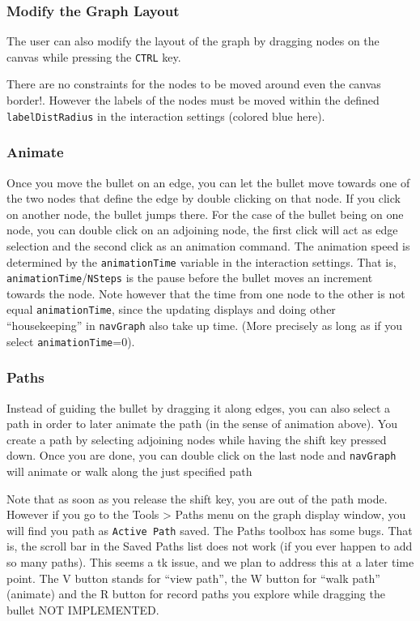 \documentclass[12pt,oneside,titlepage,letter]{article}
\newcommand{\modify}[1]{{\color{blue}#1}}
\begin{document}
\subsubsection{Modify the Graph Layout}
The user can also modify the layout of the graph by dragging nodes on the canvas while pressing the \texttt{CTRL} key.

{\fontsize{11pt}{20pt}
 
}

There are no constraints for the nodes to be moved around \modify{even the canvas border!}. However the labels of the nodes must be moved within the defined \texttt{labelDistRadius} in the interaction settings (colored blue here).

\subsubsection{Animate}
Once you move the bullet on an edge, you can let the bullet move towards one of the two nodes that define the edge by double clicking on that node. If you click on another node, the bullet jumps there. For the case of the bullet being on one node, you can double click on an adjoining node, the first click will act as edge selection and the second click as an animation command. The animation speed is determined by the \texttt{animationTime} variable in the interaction settings. That is, \texttt{animationTime}/\texttt{NSteps} is the pause before the bullet moves an increment towards the node. \modify{Note however that the time from one node to the other is not equal \texttt{animationTime}, since the updating displays and doing other ``housekeeping'' in \texttt{navGraph} also take up time. (More precisely as long as if you select \texttt{animationTime}=0).}

{\fontsize{11pt}{20pt}
 
}


\subsubsection{Paths}
Instead of guiding the bullet by dragging it along edges, you can also select a path in order to later animate the path (\modify{in the sense of animation above}). You create a path by selecting adjoining nodes while having the shift key pressed down. Once you are done, you can double click on the last node and \texttt{navGraph} will animate \modify{or walk} along the just specified path

{\fontsize{11pt}{20pt}
   
}
Note that as soon as you release the shift key, you are \modify{out of the path mode}. However if you go to the Tools > Paths menu on the graph display window, you will find you path as \texttt{Active Path} saved. \modify{The Paths toolbox has some bugs. That is, the scroll bar in the Saved Paths list does not work (if you ever happen to add so many paths). This seems a tk issue, and we plan to address this at a later time point.} The V button stands for ``view path'', the W button for ``walk path'' (animate) \modify{and the R button for record paths you explore while dragging the bullet NOT IMPLEMENTED}.\\
\end{document}
